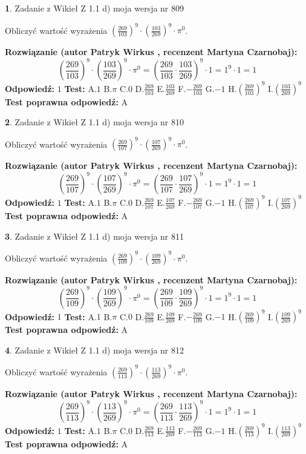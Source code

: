 \documentclass[12pt, a4paper]{article}
\theoremstyle{definition} %
\newtheorem{zad}{}
\newcommand{\zadStart}[1]{\begin{zad}#1\newline}
\newcommand{\zadStop}{\end{zad}}
\newcommand{\rozwStart}[2]{\noindent \textbf{Rozwiązanie (autor #1 , recenzent #2): }\newline}
\newcommand{\rozwStop}{\newline}
\newcommand{\odpStart}{\noindent \textbf{Odpowiedź:}\newline}
\newcommand{\odpStop}{\newline}
\newcommand{\testStart}{\noindent \textbf{Test:}\newline}
\newcommand{\testStop}{\newline}
\newcommand{\kluczStart}{\noindent \textbf{Test poprawna odpowiedź:}\newline}
\newcommand{\kluczStop}{\newline}
\begin{document}
\zadStart{Zadanie z Wikieł Z 1.1 d) moja wersja nr 809}

Obliczyć wartość wyrażenia $(\frac{269}{103})^{9} \cdot (\frac{103}{269})^{9} \cdot \pi^{0}$.
\zadStop
\rozwStart{Patryk Wirkus}{Martyna Czarnobaj}
$$(\frac{269}{103})^{9} \cdot (\frac{103}{269})^{9} \cdot \pi^{0} = (\frac{269}{103} \cdot \frac{103}{269})^{9} \cdot 1 = 1^{9} \cdot 1 = 1$$
\rozwStop
\odpStart
$1$
\odpStop
\testStart
A.$1$ B.$\pi$ C.$0$ D.$\frac{269}{103}$ E.$\frac{103}{269}$
F.$-\frac{269}{103}$ G.$-1$
H.$(\frac{269}{103})^{9}$
I.$(\frac{103}{269})^{9}$
\testStop
\kluczStart
A
\kluczStop



\zadStart{Zadanie z Wikieł Z 1.1 d) moja wersja nr 810}

Obliczyć wartość wyrażenia $(\frac{269}{107})^{9} \cdot (\frac{107}{269})^{9} \cdot \pi^{0}$.
\zadStop
\rozwStart{Patryk Wirkus}{Martyna Czarnobaj}
$$(\frac{269}{107})^{9} \cdot (\frac{107}{269})^{9} \cdot \pi^{0} = (\frac{269}{107} \cdot \frac{107}{269})^{9} \cdot 1 = 1^{9} \cdot 1 = 1$$
\rozwStop
\odpStart
$1$
\odpStop
\testStart
A.$1$ B.$\pi$ C.$0$ D.$\frac{269}{107}$ E.$\frac{107}{269}$
F.$-\frac{269}{107}$ G.$-1$
H.$(\frac{269}{107})^{9}$
I.$(\frac{107}{269})^{9}$
\testStop
\kluczStart
A
\kluczStop



\zadStart{Zadanie z Wikieł Z 1.1 d) moja wersja nr 811}

Obliczyć wartość wyrażenia $(\frac{269}{109})^{9} \cdot (\frac{109}{269})^{9} \cdot \pi^{0}$.
\zadStop
\rozwStart{Patryk Wirkus}{Martyna Czarnobaj}
$$(\frac{269}{109})^{9} \cdot (\frac{109}{269})^{9} \cdot \pi^{0} = (\frac{269}{109} \cdot \frac{109}{269})^{9} \cdot 1 = 1^{9} \cdot 1 = 1$$
\rozwStop
\odpStart
$1$
\odpStop
\testStart
A.$1$ B.$\pi$ C.$0$ D.$\frac{269}{109}$ E.$\frac{109}{269}$
F.$-\frac{269}{109}$ G.$-1$
H.$(\frac{269}{109})^{9}$
I.$(\frac{109}{269})^{9}$
\testStop
\kluczStart
A
\kluczStop



\zadStart{Zadanie z Wikieł Z 1.1 d) moja wersja nr 812}

Obliczyć wartość wyrażenia $(\frac{269}{113})^{9} \cdot (\frac{113}{269})^{9} \cdot \pi^{0}$.
\zadStop
\rozwStart{Patryk Wirkus}{Martyna Czarnobaj}
$$(\frac{269}{113})^{9} \cdot (\frac{113}{269})^{9} \cdot \pi^{0} = (\frac{269}{113} \cdot \frac{113}{269})^{9} \cdot 1 = 1^{9} \cdot 1 = 1$$
\rozwStop
\odpStart
$1$
\odpStop
\testStart
A.$1$ B.$\pi$ C.$0$ D.$\frac{269}{113}$ E.$\frac{113}{269}$
F.$-\frac{269}{113}$ G.$-1$
H.$(\frac{269}{113})^{9}$
I.$(\frac{113}{269})^{9}$
\testStop
\kluczStart
A
\kluczStop
\end{document}
